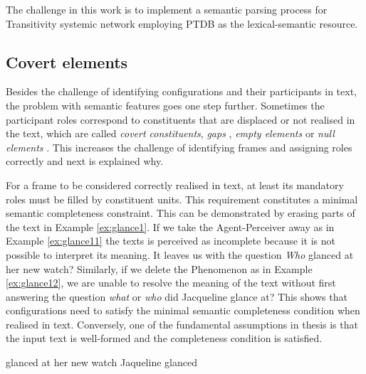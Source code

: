 The challenge in this work is to implement a semantic parsing process for Transitivity systemic network employing PTDB as the lexical-semantic resource. 

\subsection{Covert elements}

Besides the challenge of identifying configurations and their participants in text, the problem with semantic features goes one step further. Sometimes the participant roles correspond to constituents that are displaced or not realised in the text, which are called \textit{covert constituents}\citep[115,135,194]{Fawcett2008}, \textit{gaps} \citep{ross1967constraints}, \textit{empty elements} \citep[557--575]{muller2018grammatical} or \textit{null elements} \citep{Chomsky81, Chomsky1982, Chomsky1986}. This increases the challenge of identifying frames and assigning roles correctly and next is explained why. 

For a frame to be considered correctly realised in text, at least its mandatory roles must be filled by constituent units. This requirement constitutes a minimal semantic completeness constraint. This can be demonstrated by erasing parts of the text in Example \ref{ex:glance1}. If we take the Agent-Perceiver away as in Example \ref{ex:glance11} the texts is perceived as incomplete because it is not possible to interpret its meaning. It leaves us with the question \textit{Who} glanced at her new watch? Similarly, if we delete the Phenomenon as in Example \ref{ex:glance12}, we are unable to resolve the meaning of the text without first answering the question \textit{what} or \textit{who} did Jacqueline glance at? This shows that  configurations need to satisfy the minimal semantic completeness condition when realised in text. Conversely, one of the fundamental assumptions in thesis is that the input text is well-formed and the completeness condition is satisfied.

\begin{exe}
    \ex\label{ex:glance11} glanced at her new watch
    \ex\label{ex:glance12} Jaqueline glanced
\end{exe}


